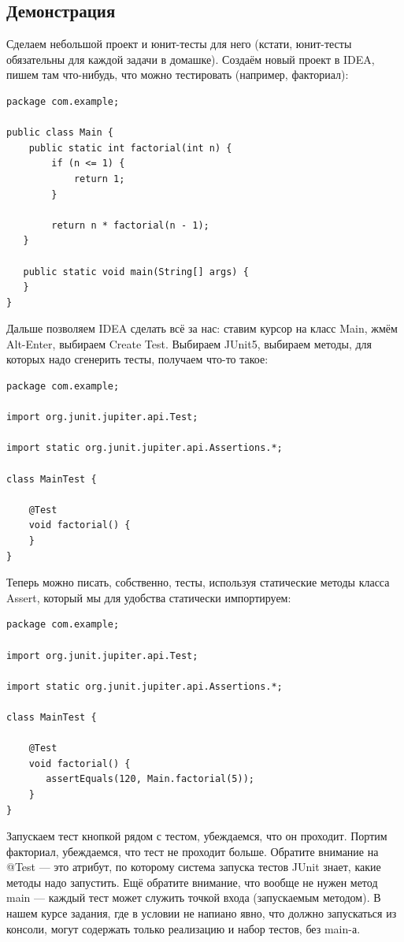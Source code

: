 \documentclass[a5paper]{article}
\begin{document}
\subsection{Демонстрация}

Сделаем небольшой проект и юнит-тесты для него (кстати, юнит-тесты обязательны для каждой задачи в домашке). Создаём новый проект в IDEA, пишем там что-нибудь, что можно тестировать (например, факториал):

\begin{verbatim}
package com.example;

public class Main {
    public static int factorial(int n) {
        if (n <= 1) {
            return 1;
        }

        return n * factorial(n - 1);
   }

   public static void main(String[] args) {
   }
}
\end{verbatim}

Дальше позволяем IDEA сделать всё за нас: ставим курсор на класс Main, жмём Alt-Enter, выбираем Create Test. Выбираем JUnit5,  выбираем методы, для которых надо сгенерить тесты, получаем что-то такое:

\begin{verbatim}
package com.example;

import org.junit.jupiter.api.Test;

import static org.junit.jupiter.api.Assertions.*;

class MainTest {

    @Test
    void factorial() {
    }
}
\end{verbatim}

Теперь можно писать, собственно, тесты, используя статические методы класса Assert, который мы для удобства статически импортируем:

\begin{verbatim}
package com.example;

import org.junit.jupiter.api.Test;

import static org.junit.jupiter.api.Assertions.*;

class MainTest {

    @Test
    void factorial() {
       assertEquals(120, Main.factorial(5));
    }
}
\end{verbatim}

Запускаем тест кнопкой рядом с тестом, убеждаемся, что он проходит. Портим факториал, убеждаемся, что тест не проходит больше. Обратите внимание на @Test --- это атрибут, по которому система запуска тестов JUnit знает, какие методы надо запустить. Ещё обратите внимание, что вообще не нужен метод main --- каждый тест может служить точкой входа (запускаемым методом). В нашем курсе задания, где в условии не напиано явно, что должно запускаться из консоли, могут содержать только реализацию и набор тестов, без main-а.
\end{document}
